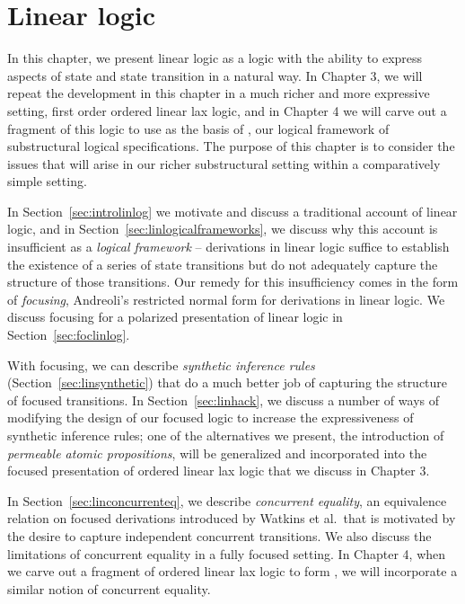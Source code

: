 
\chapter{Linear logic}

In this chapter, we present linear logic as a logic with the ability
to express aspects of state and state transition in a natural way.  In
Chapter 3, we will repeat the development in this chapter in a much
richer and more expressive setting, first order ordered linear lax
logic, and in Chapter 4 we will carve out a fragment of this logic to
use as the basis of \sls, our logical framework of substructural logical
specifications. The purpose of this chapter is to consider the issues
that will arise in our richer substructural setting within a
comparatively simple setting.

In Section~\ref{sec:introlinlog} we motivate and discuss a traditional
account of linear logic, and in
Section~\ref{sec:linlogicalframeworks}, we discuss why this account is
insufficient as a {\it logical framework} -- derivations in linear
logic suffice to establish the existence of a series of state
transitions but do not adequately capture the structure of those
transitions. Our remedy for this insufficiency comes in the form of
{\it focusing}, Andreoli's restricted normal form for derivations in
linear logic. We discuss focusing for a polarized presentation of
linear logic in Section~\ref{sec:foclinlog}.

With focusing, we can describe {\it synthetic inference rules}
(Section~\ref{sec:linsynthetic}) that do a much better job of
capturing the structure of focused transitions. In
Section~\ref{sec:linhack}, we discuss a number of ways of modifying
the design of our focused logic to increase the expressiveness of
synthetic inference rules; one of the alternatives we present, the
introduction of {\it permeable atomic propositions}, will be
generalized and incorporated into the focused presentation of ordered
linear lax logic that we discuss in Chapter 3.

In Section~\ref{sec:linconcurrenteq}, we describe {\it concurrent
  equality}, an equivalence relation on focused derivations introduced
by Watkins et al.~that is motivated by the desire to capture
independent concurrent transitions. We also discuss the limitations of
concurrent equality in a fully focused setting.  In Chapter 4, when we
carve out a fragment of ordered linear lax logic to form \sls, we will
incorporate a similar notion of concurrent equality.



